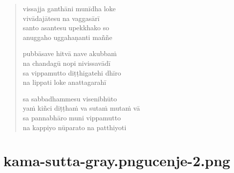 \begin{verse}
vissajja ganthāni munīdha loke\\
vivādajātesu na vaggasārī\\
santo asantesu upekkhako so\\
anuggaho uggahaṇanti maññe

pubbāsave hitvā nave akubbaṁ\\
na chandagū nopi nivissavādī\\
sa vippamutto diṭṭhigatehi dhīro\\
na lippati loke anattagarahī

sa sabbadhammesu visenibhūto\\
yaṁ kiñci diṭṭhaṁ va sutaṁ mutaṁ vā\\
sa pannabhāro muni vippamutto\\
na kappiyo nūparato na patthiyoti

\end{verse}


\chapter[Mahābyūha Sutta]{{kama-sutta-gray.png}{ucenje-2.png}}



